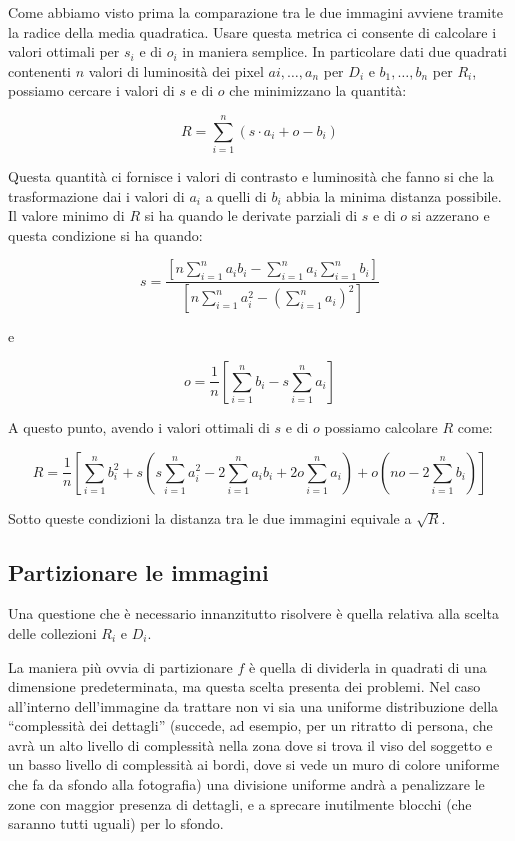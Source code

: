 \documentclass[11pt,a4paper,appendixprefix=true,numbers=noenddot]{scrreprt}
\begin{document}
Come abbiamo visto prima la comparazione tra le due immagini avviene tramite la radice della media quadratica. Usare questa metrica ci consente di calcolare i valori ottimali per $s_i$ e di $o_i$ in maniera semplice. In particolare dati due quadrati contenenti $n$ valori di luminosità dei pixel $ai, \dots, a_n$ per $D_i$ e $b_1, \dots, b_n$ per $R_i$, possiamo cercare i valori di $s$ e di $o$ che minimizzano la quantità:

\[
R = \sum_{i=1}^{n}{\left( s \cdot a_i + o - b_i \right) }
\]

Questa quantità ci fornisce i valori di contrasto e luminosità che fanno si che la trasformazione dai i valori di $a_i$  a quelli di $b_i$ abbia la minima distanza possibile. Il valore minimo di $R$ si ha quando le derivate parziali di $s$ e di $o$ si azzerano e questa condizione si ha quando:

\[
s = \dfrac{\left[ n \sum\limits_{i=1}^{n}{a_i b_i} - \sum\limits_{i=1}^{n}{a_i} \sum\limits_{i=1}^{n}{b_i} \right] }
{\left[ n \sum\limits_{i=1}^{n}{a_i^2} - {\left( \sum\limits_{i=1}^{n}{a_i} \right)}^2 \right] }
\]

e

\[
o = \frac{1}{n} \left[ \sum\limits_{i=1}^{n}{b_i} - s \sum\limits_{i=1}^{n}{a_i} \right]
\]

A questo punto, avendo i valori ottimali di $s$ e di $o$ possiamo calcolare $R$ come:

\[
R = \frac{1}{n} \left[ \sum\limits_{i=1}^{n}{b_i^2} 
+ s \left( s \sum\limits_{i=1}^{n}{a_i^2} - 2 \sum\limits_{i=1}^{n}{a_i b_i} + 2o \sum\limits_{i=1}^{n}{a_i}  \right) 
+ o \left( no - 2 \sum\limits_{i=1}^{n}{b_i} \right)  \right]
\]

Sotto queste condizioni la distanza tra le due immagini equivale a $\sqrt{R}$.

\subsection*{Partizionare le immagini}

Una questione che è necessario innanzitutto risolvere è quella relativa alla scelta delle collezioni $R_i$ e $D_i$. 

La maniera più ovvia di partizionare $f$ è quella di dividerla in quadrati di una dimensione predeterminata, ma questa scelta presenta dei problemi. Nel caso all'interno dell'immagine da trattare non vi sia una uniforme distribuzione della ``complessità dei dettagli'' (succede, ad esempio, per un ritratto di persona, che avrà un alto livello di complessità nella zona dove si trova il viso del soggetto e un basso livello di complessità ai bordi, dove si vede un muro di colore uniforme che fa da sfondo alla fotografia) una divisione uniforme andrà a penalizzare le zone con maggior presenza di dettagli, e a sprecare inutilmente blocchi (che saranno tutti uguali) per lo sfondo.
\end{document}
